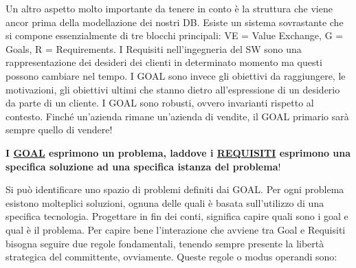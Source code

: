 Un altro aspetto molto importante da tenere in conto è la struttura che viene ancor prima della modellazione dei nostri DB. Esiste un sistema sovrastante che si compone essenzialmente di tre blocchi principali: {VE = Value Exchange, G = Goals, R = Requirements}. I Requisiti nell'ingegneria del SW sono una rappresentazione dei desideri dei clienti in determinato momento ma questi possono cambiare nel tempo. I GOAL sono invece gli obiettivi da raggiungere, le motivazioni, gli obiettivi ultimi che stanno dietro all'espressione di un desiderio da parte di un cliente. I GOAL sono robusti, ovvero invarianti rispetto al contesto. Finché un’azienda rimane un'azienda di vendite, il GOAL primario sarà sempre quello di vendere!  

\textbf{I \underline{GOAL} esprimono un problema, laddove i \underline{REQUISITI} esprimono una specifica soluzione ad una specifica istanza del problema}!
  
Si può identificare uno spazio di problemi definiti dai GOAL. Per ogni problema esistono molteplici soluzioni, ognuna delle quali è basata sull'utilizzo di una specifica tecnologia. Progettare in fin dei conti, significa capire quali sono i goal e qual è il problema. Per capire bene l'interazione che avviene tra Goal e Requisiti bisogna seguire due regole fondamentali, tenendo sempre presente la libertà strategica del committente, ovviamente.  Queste regole o modus operandi sono: 

